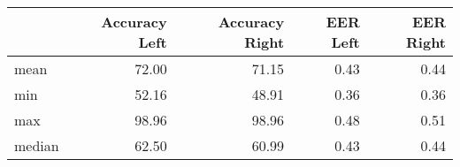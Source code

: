 \begin{tabular}{lrrrr}
\toprule
{} &  Accuracy Left &  Accuracy Right &  EER Left &  EER Right \\
\midrule
mean   &          72.00 &           71.15 &      0.43 &       0.44 \\
min    &          52.16 &           48.91 &      0.36 &       0.36 \\
max    &          98.96 &           98.96 &      0.48 &       0.51 \\
median &          62.50 &           60.99 &      0.43 &       0.44 \\
\bottomrule
\end{tabular}
